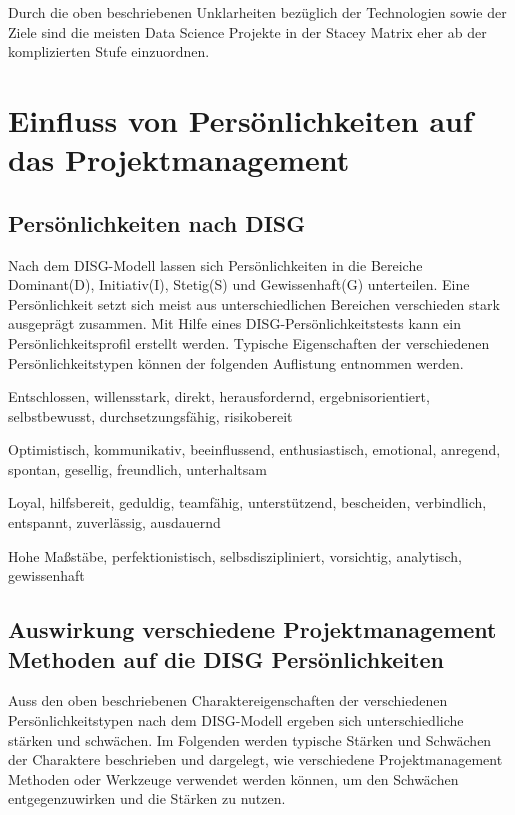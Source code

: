 \documentclass[twocolumn,10pt]{asme2ej}
\begin{document}
Durch die oben beschriebenen Unklarheiten bezüglich der Technologien sowie der Ziele sind die meisten Data Science Projekte in der Stacey Matrix eher ab der komplizierten Stufe einzuordnen.

\section{Einfluss von Persönlichkeiten auf das Projektmanagement}\label{sec:2}

\subsection{Persönlichkeiten nach DISG}
Nach dem DISG-Modell \cite{disc} lassen sich Persönlichkeiten in die Bereiche Dominant(D), Initiativ(I), Stetig(S) und Gewissenhaft(G) unterteilen. Eine Persönlichkeit setzt sich meist aus unterschiedlichen Bereichen verschieden stark ausgeprägt zusammen. Mit Hilfe eines DISG-Persönlichkeitstests kann ein Persönlichkeitsprofil erstellt werden. Typische Eigenschaften der verschiedenen Persönlichkeitstypen können der folgenden Auflistung entnommen werden.

\begin{description}[align=left]
	\item [Dominant] Entschlossen, willensstark, direkt, herausfordernd, ergebnisorientiert, selbstbewusst, durchsetzungsfähig, risikobereit
	\item [Initiativ] Optimistisch, kommunikativ, beeinflussend, enthusiastisch, emotional, anregend, spontan, gesellig, freundlich, unterhaltsam
	\item [Stetig] Loyal, hilfsbereit, geduldig, teamfähig, unterstützend, bescheiden, verbindlich, entspannt, zuverlässig, ausdauernd
	\item [Gewissenhaft] Hohe Maßstäbe, perfektionistisch, selbsdiszipliniert, vorsichtig, analytisch, gewissenhaft \cite{disg_charakteristika}
\end{description}

%

\subsection{Auswirkung verschiedene Projektmanagement Methoden auf die DISG Persönlichkeiten}
Auss den oben beschriebenen Charaktereigenschaften der verschiedenen Persönlichkeitstypen nach dem DISG-Modell ergeben sich unterschiedliche stärken und schwächen. Im Folgenden werden typische Stärken und Schwächen der Charaktere beschrieben und dargelegt, wie verschiedene Projektmanagement Methoden oder Werkzeuge verwendet werden können, um den Schwächen entgegenzuwirken und die Stärken zu nutzen.
\end{document}
